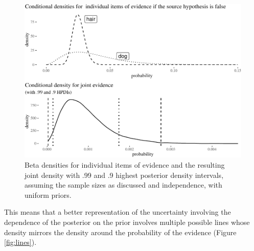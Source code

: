 \documentclass[
  10pt,
  dvipsnames,enabledeprecatedfontcommands]{scrartcl}
\begin{document}
\begin{figure}[H]


\begin{center}\includegraphics[width=0.8\linewidth]{chapter-outline_files/figure-latex/fig:densities-1} \end{center}

\caption{Beta densities for individual items of evidence and the resulting joint density with .99 and .9 highest posterior density intervals, assuming the sample sizes as discussed and independence, with uniform priors.}

\label{fig:densities}

\end{figure}

This means that a better representation of the uncertainty involving the
dependence of the posterior on the prior involves multiple possible
lines whose density mirrors the density around the probability of the
evidence (Figure \ref{fig:lines}).
\end{document}
